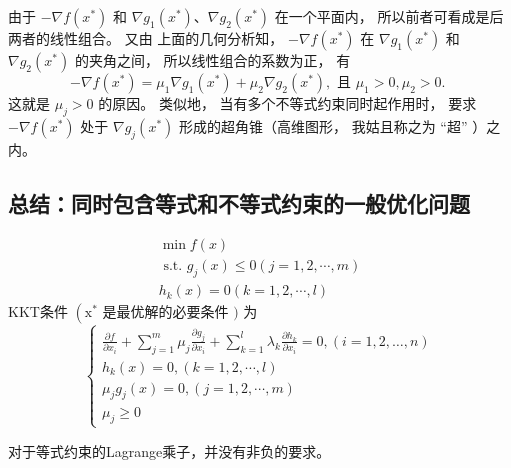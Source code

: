 由于 $ -\nabla f\left({x}^{*}\right) $ 和 $ \nabla g_{1}\left({x}^{*}\right) 、 \nabla g_{2}\left({x}^{*}\right) $ 在一个平面内， 所以前者可看成是后两者的线性组合。 又由 上面的几何分析知， $ -\nabla f\left({x}^{*}\right) $ 在 $ \nabla g_{1}\left({x}^{*}\right) $ 和 $ \nabla g_{2}\left({x}^{*}\right) $ 的夹角之间， 所以线性组合的系数为正， 有
\begin{equation}
-\nabla f\left({x}^{*}\right)=\mu_{1} \nabla g_{1}\left({x}^{*}\right)+\mu_{2} \nabla g_{2}\left({x}^{*}\right), \text { 且 } \mu_{1}>0, \mu_{2}>0 \text {. }
\end{equation}
这就是 $ \mu_{j}>0 $ 的原因。 类似地， 当有多个不等式约束同时起作用时， 要求 $ -\nabla f\left({x}^{*}\right) $ 处于 $ \nabla g_{j}\left({x}^{*}\right) $ 形成的超角锥（高维图形， 我姑且称之为 “超” ）之内。

\subsection{总结：同时包含等式和不等式约束的一般优化问题}

\begin{theorem}[同时包含等式和不等式约束的一般优化问题的KKT条件]
    \begin{equation}
\begin{array}{l}
\min f({x}) \\
\text { s.t. } g_{j}({x}) \leq 0(j=1,2, \cdots, m) \\
h_{k}({x})=0(k=1,2, \cdots, l)
\end{array}
\end{equation}
KKT条件 $ \left(\mathrm{x}^{*}\right. $ 是最优解的必要条件 $ ) $ 为
\begin{equation}
\left\{\begin{array}{l}
\frac{\partial f}{\partial x_{i}}+\sum_{j=1}^{m} \mu_{j} \frac{\partial g_{j}}{\partial x_{i}}+\sum_{k=1}^{l} \lambda_{k} \frac{\partial h_{k}}{\partial x_{i}}=0,(i=1,2, \ldots, n) \\
h_{k}({x})=0,(k=1,2, \cdots, l) \\
\mu_{j} g_{j}({x})=0,(j=1,2, \cdots, m) \\
\mu_{j} \geq 0
\end{array}\right.
\end{equation}
\end{theorem}

\begin{remark}
    对于等式约束的Lagrange乘子，并没有非负的要求。
\end{remark}


